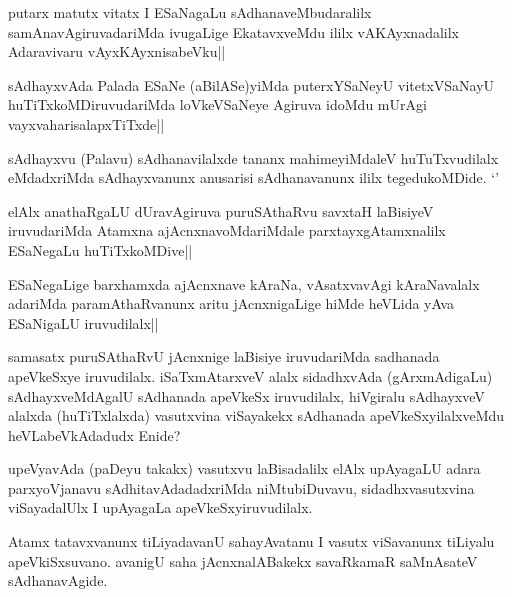 \begin{artha}
putarx matutx vitatx I ESaNagaLu sAdhanaveMbudaralilx samAnavAgiruvadariMda ivugaLige EkatavxveMdu ililx vAKAyxnadalilx Adaravivaru vAyxKAyxnisabeVku||
\end{artha}

\begin{artha}
sAdhayxvAda Palada ESaNe (aBilASe)yiMda puterxYSaNeyU vitetxVSaNayU huTiTxkoMDiruvudariMda loVkeVSaNeye Agiruva idoMdu mUrAgi vayxvaharisalapxTiTxde||
\end{artha}


\begin{artha}
sAdhayxvu (Palavu) sAdhanavilalxde tananx mahimeyiMdaleV huTuTxvudilalx eMdadxriMda sAdhayxvanunx anusarisi sAdhanavanunx ililx tegedukoMDide. `\stext '
\end{artha}%

\begin{artha}
elAlx anathaRgaLU dUravAgiruva puruSAthaRvu savxtaH laBisiyeV iruvudariMda Atamxna ajAcnxnavoMdariMdale parxtayxgAtamxnalilx ESaNegaLu huTiTxkoMDive||
\end{artha}

\begin{artha}
ESaNegaLige barxhamxda ajAcnxnave kAraNa, vAsatxvavAgi kAraNavalalx adariMda paramAthaRvanunx aritu jAcnxnigaLige hiMde heVLida yAva ESaNigaLU iruvudilalx||
\end{artha}

\begin{artha}
samasatx puruSAthaRvU jAcnxnige laBisiye iruvudariMda sadhanada apeVkeSxye iruvudilalx. iSaTxmAtarxveV alalx sidadhxvAda (gArxmAdigaLu) sAdhayxveMdAgalU sAdhanada apeVkeSx iruvudilalx, hiVgiralu sAdhayxveV alalxda (huTiTxlalxda) vasutxvina viSayakekx sAdhanada apeVkeSxyilalxveMdu heVLabeVkAdadudx Enide? 
\end{artha}

\begin{artha}
upeVyavAda (paDeyu takakx) vasutxvu laBisadalilx elAlx upAyagaLU adara parxyoVjanavu sAdhitavAdadadxriMda niMtubiDuvavu, sidadhxvasutxvina viSayadalUlx I upAyagaLa apeVkeSxyiruvudilalx.
\end{artha}%


\begin{artha}
Atamx tatavxvanunx tiLiyadavanU sahayAvatanu I vasutx viSavanunx tiLiyalu apeVkiSxsuvano. avanigU saha jAcnxnalABakekx savaRkamaR saMnAsateV sAdhanavAgide.
\end{artha}

